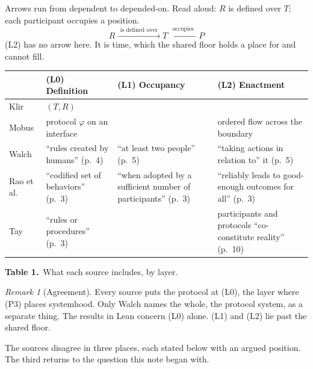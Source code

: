 \documentclass[10pt]{article}
\theoremstyle{definition}
\theoremstyle{remark}
\newtheorem*{remark}{Remark}
\begin{document}
Arrows run from dependent to depended-on. Read aloud: $R$ is defined over $T$; each participant occupies a position.
\[
  R \xrightarrow{\ \ \text{is defined over}\ \ } T \xleftarrow{\ \ \text{occupies}\ \ } P
\]
(L2) has no arrow here. It is time, which the shared floor holds a place for and cannot fill.

\begin{center}\small
\begin{tabular}{@{}>{\raggedright}p{2.3cm}>{\raggedright}p{3.9cm}>{\raggedright}p{3.9cm}>{\raggedright\arraybackslash}p{4.6cm}@{}}
\toprule
 & (L0) Definition & (L1) Occupancy & (L2) Enactment \\
\midrule
Klir \cite{klir} & $(T, R)$ & & \\
Mobus \cite{mobus} & protocol $\varphi$ on an interface & & ordered flow across the boundary \\
Walch \cite{walch} & ``rules created by humans'' (p.~4) & ``at least two people'' (p.~5) & ``taking actions in relation to'' it (p.~5) \\
Rao et al.\ \cite{rao} & ``codified set of behaviors'' (p.~3) & ``when adopted by a sufficient number of participants'' (p.~3) & ``reliably leads to good-enough outcomes for all'' (p.~3) \\
Tay \cite{tay} & ``rules or procedures'' (p.~3) & & participants and protocols ``co-constitute reality'' (p.~10) \\
\bottomrule
\end{tabular}

\smallskip
\textbf{Table 1.}\ What each source includes, by layer.\label{tab:layers}
\end{center}

\begin{remark}[Agreement]
Every source puts the protocol at (L0), the layer where (P3) places systemhood. Only Walch names the whole, the protocol system, as a separate thing. The results in Lean concern (L0) alone. (L1) and (L2) lie past the shared floor.
\end{remark}

The sources disagree in three places, each stated below with an argued position. The third returns to the question this note began with.
\end{document}
